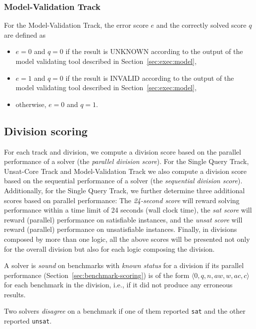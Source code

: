 \documentclass[12pt]{article}
\newcommand{\maintrack}{Single Query Track\xspace}
\newcommand{\ucoretrack}{Unsat-Core Track\xspace}
\newcommand{\mvaltrack}{Model-Validation Track\xspace}
\begin{document}
\subsubsection{\mvaltrack}
  For the \mvaltrack, the error score $e$ and the correctly solved score $q$
  are defined as
  \begin{itemize}
  \item $e=0$ and $q=0$ if the result is UNKNOWN according to the output of
    the model validating tool described in Section~\ref{sec:exec:model},
  \item $e=1$ and $q=0$ if the result is INVALID according to the output of
    the model validating tool described in Section~\ref{sec:exec:model},
  \item otherwise, $e=0$ and $q=1$.
  \end{itemize}

\subsection{Division scoring}
\label{sec:division-scoring}

For each track and division, we compute a division score based on the parallel
performance of a solver (the \emph{parallel division score}).  For the
\maintrack, \ucoretrack and \mvaltrack we also compute a division
score based on the sequential performance of a solver (the \emph{sequential
division score}).  Additionally, for the \maintrack, we further determine three
additional scores based on parallel performance: The \emph{24-second score}
will reward solving performance within a time limit of 24 seconds (wall clock
time), the \emph{sat score} will reward (parallel) performance on satisfiable
instances, and the \emph{unsat score} will reward (parallel) performance on
unsatisfiable instances.
%
Finally, in divisions composed by more than one logic, all the above scores will
be presented not only for the overall division but also for each logic composing
the division.

A solver is \emph{sound} on benchmarks with \emph{known status} for a division
if its parallel performance (Section~\ref{sec:benchmark-scoring}) is of the
form $\langle 0, q, n, \mathit{aw}, w, \mathit{ac}, c\rangle$ for each benchmark in the division, i.e., if
it did not produce any erroneous results.

Two solvers \emph{disagree} on a benchmark if one of them reported \texttt{sat}
and the other reported \texttt{unsat}.
\end{document}
